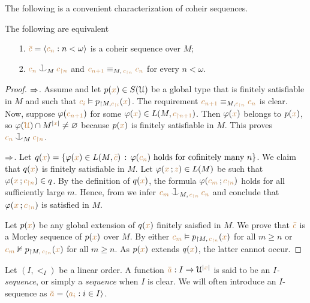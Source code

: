 \documentclass[creche.tex]{subfiles}
\begin{document}
The following is a convenient characterization of coheir sequences.

\begin{lemma}\label{lem_coheir_property}
The following are equivalent
\begin{itemize}
\item[1.] ${\color{brown}\bar c}=\langle{\color{brown}c_n}:n<\omega\rangle$ is a coheir sequence over $M$;
\item[2.] ${\mr c_n}\cnonfork_M{\mr c_{\restriction n}}$ and ${\color{brown} c_{n+1}}\equiv_{M,\,{\color{brown} c_{\restriction n}}}{\color{brown} c_n}$ for every $n<\omega$.
\end{itemize}
\end{lemma}

\begin{proof}
$\Rightarrow$.
Assume  and let $p({\color{brown} x})\in S(\EuScript U)$ be a global type that is finitely satisfiable in $M$ and such that ${\color{brown} c_i}\vDash p_{\restriction M,{\color{brown} c_{\restriction i}}}({\color{brown} x})$.
The requirement ${\color{brown} c_{n+1}}\equiv_{M,{\color{brown} c_{\restriction n}}} {\color{brown} c_n}$ is clear.
Now, suppose $\varphi({\color{brown} c_{n+1}})$ for some $\varphi({\color{brown} x})\in L(M,{\color{brown} c_{\restriction n+1}})$.
Then $\varphi({\color{brown} x})$ belongs to $p({\color{brown} x})$, so $\varphi({\color{brown}\EuScript U})\cap M^{|{\color{brown} x}|}\neq\varnothing$ because $p({\color{brown} x})$ is finitely satisfiable in $M$. This proves ${\mr c_n}\cnonfork_M{\mr c_{\restriction n}}$.

$\Rightarrow$.
Let $q({\color{brown} x})=\{\varphi({\color{brown} x})\in L(M, {\color{brown}\bar c})\,:\, \varphi({\color{brown} c_n}) \textrm{ holds for cofinitely many } n\}$.
%
We claim that $q({\color{brown} x})$ is finitely satisfiable in $M$.
%
Let $\varphi({\color{brown} x}\,;{\color{brown} z})\in L(M)$ be such that $\varphi({\color{brown} x}\,;{\color{brown} c_{\restriction n}})\in q$.
%
By the definition of $q({\color{brown} x})$, the formula $\varphi({\color{brown} c_m}\,;{\color{brown} c_{\restriction n}})$ holds for all sufficiently large $m$.
%
Hence, from  we infer ${\mr c_m}\cnonfork_{M,\,{\mr c_{\restriction n}}}{\mr c_n}$ and conclude that $\varphi({\color{brown} x}\,;{\color{brown} c_{\restriction n}})$ is satisfied in $M$.

Let $p({\color{brown} x})$ be any global extension of $q({\color{brown} x})$ finitely saisfied in $M$. 
%
We prove that ${\color{brown}\bar c}$ is a Morley sequence of $p({\color{brown} x})$ over $M$.
%
By  either ${\color{brown} c_m}\vDash p_{\restriction  M,\,{\color{brown} c_{\restriction n}}}({\color{brown} x})$ for all $m\ge n$ or ${\color{brown} c_m}\nvDash p_{\restriction  M,\,{\color{brown} c_{\restriction n}}}({\color{brown} x})$ for all $m\ge n$.
%
As $p({\color{brown} x})$ extends $q({\color{brown} x})$, the latter cannot occur.
\end{proof}

Let $(I,<_I)$ be a linear order.
A function ${\color{brown}\bar a}:I\to\EuScript U^{|{\color{brown} x}|}$ is said to be an \emph{$I$-sequence}, or simply a \emph{sequence\/} when $I$ is clear.
We will often introduce an $I$-sequence as ${\color{brown}\bar a}=\langle{\color{brown}a_i}: i\in I\rangle$.
\end{document}
